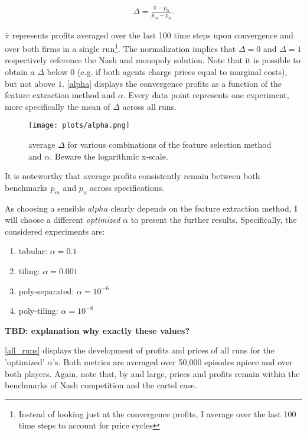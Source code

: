 \begin{gather}
\Delta = \frac{\bar{\pi} - p_n}{p_m - p_n}.
\end{gather}

$\bar{\pi}$ represents profits averaged over the last 100 time steps upon convergence and over both firms in a single run\footnote{Instead of looking just at the convergence profits, I average over the last 100 time steps to account for price cycles}. The normalization implies that $\Delta = 0$ and $\Delta = 1$ respectively reference the Nash and monopoly solution. Note that it is possible to obtain a $\Delta$ below $0$ (e.g. if both agents charge prices equal to marginal costs), but not above $1$. \autoref{alpha} displays the convergence profits as a function of the feature extraction method and $\alpha$. Every data point represents one experiment, more specifically the mean of $\Delta$ across all runs.

\begin{figure}
	\texttt{[image: plots/alpha.png]}
	\caption{average $\Delta$ for various combinations of the feature selection method and $\alpha$. Beware the logarithmic x-scale.}
	\label{alpha}
\end{figure}

It is noteworthy that average profits consistently remain between both benchmarks $p_m$ and $p_n$ across specifications.


As choosing a sensible $alpha$ clearly depends on the feature extraction method, I will choose a different \emph{optimized} $\alpha$ to present the further results. Specifically, the considered experiments are:

\begin{enumerate}
	\item tabular: $\alpha = 0.1$
	\item tiling: $\alpha = 0.001$
	\item poly-separated: $\alpha = 10^{-6}$
	\item poly-tiling: $\alpha = 10^{-8}$
\end{enumerate}

\textbf{TBD: explanation why exactly these values?}

\autoref{all_runs} displays the development of profits and prices of all runs for the 'optimized' $\alpha$'s. Both metrics are averaged over 50,000 episodes apiece and over both players. Again, note that, by and large, prices and profits remain within the benchmarks of Nash competition and the cartel case.

